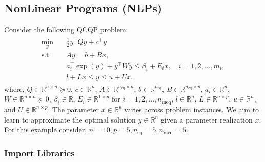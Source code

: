 \documentclass[letterpaper,10pt,english,openany,oneside]{sphinxmanual}
\begin{document}
\sphinxstepscope


\subsection{NonLinear Programs (NLPs)}
\label{\detokenize{examples/03_Example_NLP:nonlinear-programs-nlps}}\label{\detokenize{examples/03_Example_NLP::doc}}
\sphinxAtStartPar
Consider the following QCQP problem:
\begin{equation*}
\begin{split}\begin{aligned}
\min_{y} \quad & \frac{1}{2} y^\top Q y + c^\top y \\
\text{s.t.} \quad
& A y = b + B x, \\
& a_i^\top \exp(y) + y^\top W y \leq \beta_i + E_i x, \quad i = 1, 2, \ldots, m_i, \\
& l + L x \leq y \leq u + U x.
\end{aligned}\end{split}
\end{equation*}
\sphinxAtStartPar
where, \(Q \in \mathbb{R}^{n \times n} \succeq 0\), \(c \in \mathbb{R}^n\), \(A \in \mathbb{R}^{n_{\textrm{eq}} \times n}\), \(b \in \mathbb{R}^{n_{\textrm{eq}}}\), \(B \in \mathbb{R}^{n_{\textrm{eq}} \times p}\), \(a_i \in \mathbb{R}^n\), \(W \in \mathbb{R}^{n \times n} \succeq 0\), \(\beta_i \in \mathbb{R}\), \(E_i \in \mathbb{R}^{1 \times p}\) for \(i = 1,2,\ldots,n_{\textrm{ineq}}\), \(l \in \mathbb{R}^n\), \(L \in \mathbb{R}^{n \times p}\), \(u \in \mathbb{R}^n\), and \(U \in \mathbb{R}^{n \times p}\). The parameter \(x \in \mathbb{R}^p\) varies across problem instances. We aim to learn to approximate the optimal solution \(y \in \mathbb{R}^n\) given a parameter realization \(x\). For this example consider, \(n=10, p=5,n_\textrm{eq}=5,n_\textrm{ineq}=5\).


\subsubsection{Import Libraries}
\label{\detokenize{examples/03_Example_NLP:import-libraries}}
\begin{sphinxVerbatim}[commandchars=\\\{\}]
 
\end{sphinxVerbatim}
\end{document}
